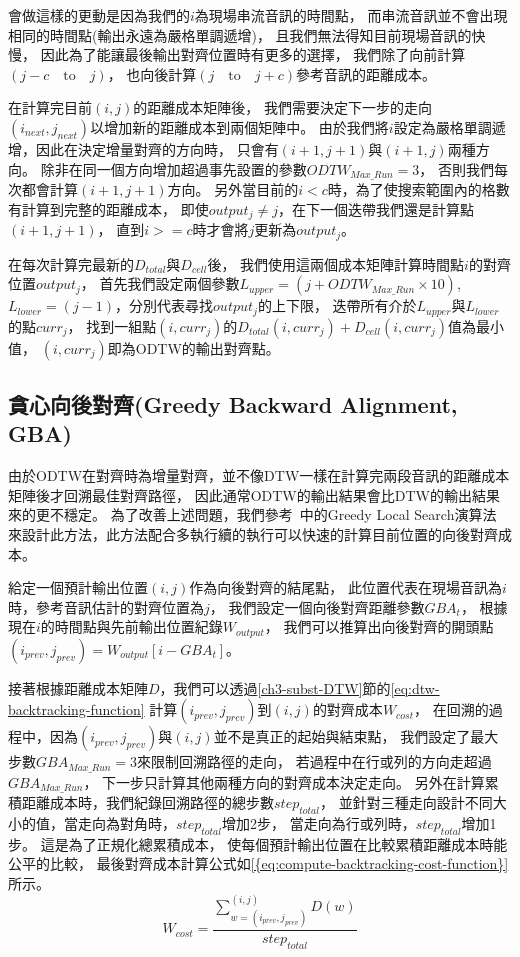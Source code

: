 \documentclass[class=NCU_thesis, crop=false]{standalone}
\begin{document}
會做這樣的更動是因為我們的$i$為現場串流音訊的時間點，
而串流音訊並不會出現相同的時間點(輸出永遠為嚴格單調遞增)，
且我們無法得知目前現場音訊的快慢，
因此為了能讓最後輸出對齊位置時有更多的選擇，
我們除了向前計算$(j-c \quad \text{to} \quad j)$，
也向後計算$(j \quad \text{to} \quad j+c)$參考音訊的距離成本。

在計算完目前$(i, j)$的距離成本矩陣後，
我們需要決定下一步的走向$(i_{next}, j_{next})$以增加新的距離成本到兩個矩陣中。
由於我們將$i$設定為嚴格單調遞增，因此在決定增量對齊的方向時，
只會有$(i+1, j+1)$與$(i+1, j)$兩種方向。
除非在同一個方向增加超過事先設置的參數$ODTW_{Max\_Run} = 3$，
否則我們每次都會計算$(i+1, j+1)$方向。
另外當目前的$i < c$時，為了使搜索範圍內的格數有計算到完整的距離成本，
即使$output_j \neq j$，在下一個迭帶我們還是計算點$(i+1, j+1)$，
直到$i >= c$時才會將$j$更新為$output_j$。

在每次計算完最新的$D_{total}$與$D_{cell}$後，
我們使用這兩個成本矩陣計算時間點$i$的對齊位置$output_j$，
首先我們設定兩個參數$L_{upper} = (j+ODTW_{Max\_Run}\times 10)$,
$L_{lower} = (j-1)$，分別代表尋找$output_j$的上下限，
迭帶所有介於$L_{upper}$與$L_{lower}$的點$curr_{j}$，
找到一組點$(i, curr_{j})$的$D_{total}(i, curr_{j})+D_{cell}(i, curr_{j})$值為最小值，
$(i, curr_{j})$即為ODTW的輸出對齊點。

\subsection{貪心向後對齊(Greedy Backward Alignment, GBA)} \label{ch3-subst-GBA}
由於ODTW在對齊時為增量對齊，並不像DTW一樣在計算完兩段音訊的距離成本矩陣後才回溯最佳對齊路徑，
因此通常ODTW的輸出結果會比DTW的輸出結果來的更不穩定。
為了改善上述問題，我們參考~\cite{Arzt2010Towards}中的Greedy Local Search演算法
來設計此方法，此方法配合多執行續的執行可以快速的計算目前位置的向後對齊成本。

給定一個預計輸出位置$(i, j)$作為向後對齊的結尾點，
此位置代表在現場音訊為$i$時，參考音訊估計的對齊位置為$j$，
我們設定一個向後對齊距離參數$GBA_{t}$，
根據現在$i$的時間點與先前輸出位置紀錄$W_{output}$，
我們可以推算出向後對齊的開頭點$(i_{prev}, j_{prev}) = W_{output}[i-GBA_{t}]$。

接著根據距離成本矩陣$D$，我們可以透過\ref{ch3-subst-DTW}節的\cref{eq:dtw-backtracking-function}
計算$(i_{prev}, j_{prev})$到$(i, j)$的對齊成本$W_{cost}$，
在回溯的過程中，因為$(i_{prev}, j_{prev})$與$(i, j)$並不是真正的起始與結束點，
我們設定了最大步數$GBA_{Max\_Run}=3$來限制回溯路徑的走向，
若過程中在行或列的方向走超過$GBA_{Max\_Run}$，
下一步只計算其他兩種方向的對齊成本決定走向。
另外在計算累積距離成本時，我們紀錄回溯路徑的總步數$step_{total}$，
並針對三種走向設計不同大小的值，當走向為對角時，$step_{total}$增加2步，
當走向為行或列時，$step_{total}$增加1步。
這是為了正規化總累積成本，
使每個預計輸出位置在比較累積距離成本時能公平的比較，
最後對齊成本計算公式如\cref{{eq:compute-backtracking-cost-function}}所示。
\begin{equation}
    \label{eq:compute-backtracking-cost-function}
    W_{cost} = \frac{\sum_{w = (i_{prev}, j_{prev})}^{(i, j)}D(w)}{step_{total}} 
\end{equation}
\end{document}
